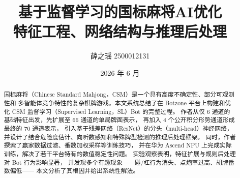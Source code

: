 \documentclass{article}
\title{%
  \textbf{基于监督学习的国标麻将AI优化}\\
  \large 特征工程、网络结构与推理后处理
}
\author{%
  薛之瑶 2500012131 \\
}
\date{2026 年 6 月}
\begin{document}
\maketitle
\thispagestyle{empty}

\begin{abstract}
国标麻将（Chinese Standard Mahjong，CSM）是一个具有高度不确定性、部分可观测性和
多智能体竞争特性的复杂棋牌游戏。本文系统总结了在 Botzone 平台上构建和优化 CSM
监督学习（Supervised Learning，SL）Bot 的完整过程。
作者从仅 $6$ 通道的基础特征出发，先扩展至 $66$ 通道的单局牌面表示，
再加入 4 个公开积分形势通道形成最终的 $70$ 通道表示，
引入基于残差网络（ResNet）的分头（multi-head）神经网络，
并设计了结合危险度估计、向听数感知和特殊牌型检测的推理后处理框架。
同时，作者探索了赢家数据过滤、番数加权采样等训练技巧，
并在华为 Ascend NPU 上完成实际训练，解决了若干平台特有的数值稳定性问题。
实验观察表明，特征扩展与规则后处理对 Bot 行为影响显著，
并发现多个有趣现象——碰/杠行为消失、点炮率过高、胡牌番数偏低——
本文分析了其根因并给出系统性解法。
\end{abstract}
\end{document}
